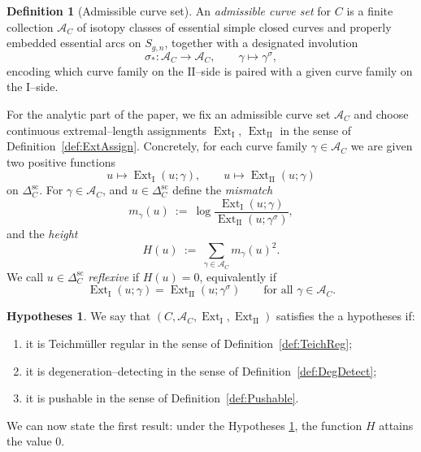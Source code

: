 \documentclass[a4paper,12pt]{amsart}
\DeclareMathOperator{\Ext}{Ext}
\theoremstyle{plain}
\theoremstyle{definition}
\newtheorem{definition}[theorem]{Definition}
\newtheorem{Hypotheses}[theorem]{Hypotheses}
\begin{document}
\begin{definition}[Admissible curve set]\label{def:AC}
An \emph{admissible curve set} for $C$ is a finite collection $\mathcal A_C$ of isotopy classes of essential
simple closed curves and properly embedded essential arcs on $S_{g,n}$,
together with a designated involution
\[
\sigma_\ast:\mathcal A_C\longrightarrow\mathcal A_C,\qquad \gamma\longmapsto \gamma^\sigma,
\]
encoding which curve family on the $\mathrm{II}$--side is paired with a given curve family on the $\mathrm{I}$--side.
\end{definition}

\medskip

For the analytic part of the paper, we fix an admissible curve set $\mathcal A_C$ and choose
continuous extremal--length assignments $\Ext_{\mathrm{I}},\,\Ext_{\mathrm{II}}$ in the sense of
Definition~\ref{def:ExtAssign}.
Concretely, for each curve family $\gamma\in\mathcal A_C$ we are given two positive functions
\[
u\longmapsto \Ext_{\mathrm{I}}(u;\gamma),\qquad
u\longmapsto \Ext_{\mathrm{II}}(u;\gamma)
\]
on $\Delta_C^{\mathrm{sc}}$. For $\gamma\in\mathcal A_C$, and \(u\in\Delta_C^{\mathrm{sc}}\) define the \emph{mismatch}
\[
m_\gamma(u)\ :=\ \log\frac{\Ext_{\mathrm{I}}(u;\gamma)}{\Ext_{\mathrm{II}}(u;\gamma^\sigma)},
\]
and  the \emph{height}
\begin{equation}\label{eq:height-def}
H(u)\ :=\ \sum_{\gamma\in\mathcal A_C} m_\gamma(u)^2.
\end{equation}
We call $u\in\Delta_C^{\mathrm{sc}}$ \emph{reflexive} if $H(u)=0$, equivalently if
\[
\Ext_{\mathrm{I}}(u;\gamma)=\Ext_{\mathrm{II}}(u;\gamma^\sigma)\qquad\text{for all }\gamma\in\mathcal A_C.
\]
\begin{Hypotheses}\label{def:axioms}
We say that $(C,\mathcal A_C,\Ext_{\mathrm{I}},\Ext_{\mathrm{II}})$ satisfies the a hypotheses if:
\begin{enumerate}[label=\textup{(H\arabic*)}, leftmargin=2.8em]
\item it is Teichm\"uller regular in the sense of Definition~\ref{def:TeichReg};
\item it is degeneration--detecting in the sense of Definition~\ref{def:DegDetect};
\item it is pushable in the sense of Definition~\ref{def:Pushable}.
\end{enumerate}
\end{Hypotheses}

We can now state the first  result: under the Hypotheses \ref{def:axioms}, the function $H$ attains the value $0$.
\end{document}
